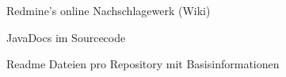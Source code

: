 \begin{frame}
\begin{block}{}
	Redmine's online Nachschlagewerk (Wiki)
\end{block}
\begin{block}{}
	JavaDocs im Sourcecode
\end{block}
\begin{block}{}
	Readme Dateien pro Repository mit Basisinformationen
\end{block}
\end{frame}